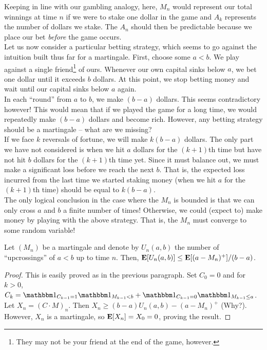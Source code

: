 Keeping in line with our gambling analogy, here, $M_n$ would represent our total winnings at time $n$ if we were to stake one dollar in the game and $A_k$ represents the number of dollars we stake. The $A_n$ should then be predictable because we place our bet \textit{before} the game occurs.\\

Let us now consider a particular betting strategy, which seems to go against the intuition built thus far for a martingale. First, choose some $a<b$. We play against a single friend\footnote{They may not be your friend at the end of the game, however.} of ours. Whenever our own capital sinks below $a$, we bet one dollar until it exceeds $b$ dollars. At this point, we stop betting money and wait until our capital sinks below $a$ again.\\
In each ``round'' from $a$ to $b$, we make $(b-a)$ dollars. This seems contradictory however! This would mean that if we played the game for a long time, we would repeatedly make $(b-a)$ dollars and become rich. However, any betting strategy should be a martingale -- what are we missing?\\
If we face $k$ reversals of fortune, we will make $k(b-a)$ dollars. The only part we have not considered is when we hit $a$ dollars for the $(k+1)$th time but have not hit $b$ dollars for the $(k+1)$th time yet. Since it must balance out, we must make a significant loss before we reach the next $b$. That is, the expected loss incurred from the last time we started staking money (when we hit $a$ for the $(k+1)$th time) should be equal to $k(b-a)$.\\
The only logical conclusion in the case where the $M_n$ is bounded is that we can only cross $a$ and $b$ a finite number of times! Otherwise, we could (expect to) make money by playing with the above strategy. That is, the $M_n$ must converge to some random variable!

\begin{lemma}
	\label{doob's upcrossing lemma}
	Let $(M_n)$ be a martingale and denote by $U_n(a,b)$ the number of ``upcrossings'' of $a<b$ up to time $n$. Then, $\textbf{E}[U_n(a,b)] \leq \textbf{E}[(a-M_n)^+]/(b-a)$.
\end{lemma}
\begin{proof}
	This is easily proved as in the previous paragraph. Set $C_0 = 0$ and for $k>0$, $C_k = \indic_{C_{k-1}=1}\indic_{M_{k-1} < b} + \indic_{C_{k-1}=0}\indic_{M_{k-1} \leq a}$. Let $X_n = (C\cdot M)_n$. Then $X_n \geq (b-a)U_n(a,b) - (a-M_n)^+$ (Why?). However, $X_n$ is a martingale, so $\textbf{E}[X_n] = X_0 = 0$, proving the result.
\end{proof}

